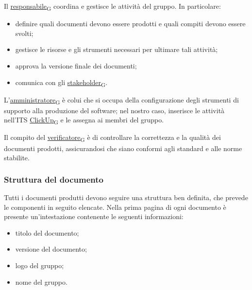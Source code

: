 Il \href{https://7last.github.io/docs/pb/documentazione-interna/glossario\#responsabile}{responsabile\textsubscript{G}} coordina e gestisce le attività del gruppo. In particolare:
\begin{itemize}
	\item definire quali documenti devono essere prodotti e quali compiti devono essere svolti;
	\item gestisce le risorse e gli strumenti necessari per ultimare tali attività;
	\item approva la versione finale dei documenti;
	\item comunica con gli \href{https://7last.github.io/docs/pb/documentazione-interna/glossario\#stakeholder}{stakeholder\textsubscript{G}}.
\end{itemize}

L’\href{https://7last.github.io/docs/pb/documentazione-interna/glossario\#amministratore}{amministratore\textsubscript{G}} è colui che si occupa della configurazione degli strumenti di supporto alla produzione del software; nel nostro caso,
inserisce le attività nell'ITS \href{https://7last.github.io/docs/pb/documentazione-interna/glossario\#clickup}{ClickUp\textsubscript{G}} e le assegna ai membri del gruppo.

Il compito del \href{https://7last.github.io/docs/pb/documentazione-interna/glossario\#verificatore}{verificatore\textsubscript{G}} è di controllare la correttezza e la qualità dei documenti prodotti, assicurandosi che siano conformi agli standard e alle norme stabilite.

\subsubsection{Struttura del documento}
Tutti i documenti produtti devono seguire una struttura ben definita, che prevede le componenti in seguito elencate.
Nella prima pagina di ogni documento è presente un'intestazione contenente le seguenti informazioni:
\begin{itemize}
	\item titolo del documento;
	\item versione del documento;
	\item logo del gruppo;
	\item nome del gruppo.
\end{itemize}

